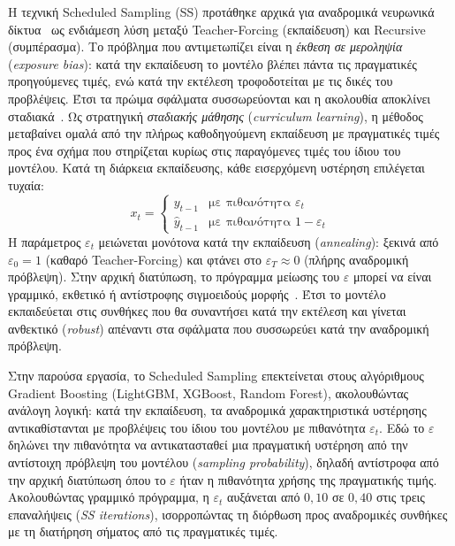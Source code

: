 Η τεχνική Scheduled Sampling (SS) προτάθηκε αρχικά
για αναδρομικά νευρωνικά δίκτυα~\cite{bengio2015scheduled}
ως ενδιάμεση λύση μεταξύ Teacher-Forcing (εκπαίδευση) και Recursive (συμπέρασμα). Το πρόβλημα που αντιμετωπίζει είναι η \emph{έκθεση σε μεροληψία} (\textit{exposure bias}): κατά την εκπαίδευση το μοντέλο βλέπει πάντα τις πραγματικές προηγούμενες τιμές, ενώ κατά την εκτέλεση τροφοδοτείται με τις δικές του προβλέψεις. Έτσι τα πρώιμα σφάλματα συσσωρεύονται και η ακολουθία αποκλίνει σταδιακά~\cite{bengio2015scheduled}. Ως στρατηγική \emph{σταδιακής μάθησης} (\textit{curriculum learning}), η μέθοδος μεταβαίνει ομαλά από την πλήρως καθοδηγούμενη εκπαίδευση με πραγματικές τιμές προς ένα σχήμα που στηρίζεται κυρίως στις παραγόμενες τιμές του ίδιου του μοντέλου. Κατά τη διάρκεια εκπαίδευσης,
κάθε εισερχόμενη υστέρηση επιλέγεται τυχαία:
%
\begin{equation}
  x_t = \begin{cases}
    y_{t-1}       & \text{με πιθανότητα } \varepsilon_t \\
    \hat{y}_{t-1} & \text{με πιθανότητα } 1 - \varepsilon_t
  \end{cases}
  \label{eq:ss}
\end{equation}
%
Η παράμετρος $\varepsilon_t$ μειώνεται μονότονα
κατά την εκπαίδευση (\textit{annealing}): ξεκινά
από $\varepsilon_0 = 1$ (καθαρό Teacher-Forcing)
και φτάνει στο $\varepsilon_T \approx 0$
(πλήρης αναδρομική πρόβλεψη). Στην αρχική διατύπωση, το πρόγραμμα μείωσης του $\varepsilon$ μπορεί να είναι γραμμικό, εκθετικό ή αντίστροφης σιγμοειδούς μορφής~\cite{bengio2015scheduled}. Έτσι το μοντέλο εκπαιδεύεται στις συνθήκες που θα συναντήσει κατά την εκτέλεση και γίνεται ανθεκτικό (\textit{robust}) απέναντι στα σφάλματα που συσσωρεύει κατά την αναδρομική πρόβλεψη.

Στην παρούσα εργασία, το Scheduled Sampling
επεκτείνεται στους αλγόριθμους Gradient Boosting
(LightGBM, XGBoost, Random Forest), ακολουθώντας
ανάλογη λογική: κατά την εκπαίδευση, τα αναδρομικά χαρακτηριστικά υστέρησης αντικαθίστανται με
προβλέψεις του ίδιου του μοντέλου με πιθανότητα $\varepsilon_t$. Εδώ το $\varepsilon$ δηλώνει την πιθανότητα να αντικατασταθεί μια πραγματική υστέρηση από την αντίστοιχη πρόβλεψη του μοντέλου (\textit{sampling probability}), δηλαδή αντίστροφα από την αρχική διατύπωση όπου το $\varepsilon$ ήταν η πιθανότητα χρήσης της πραγματικής τιμής. Ακολουθώντας γραμμικό πρόγραμμα, η $\varepsilon_t$ αυξάνεται από $0{,}10$ σε $0{,}40$ στις τρεις επαναλήψεις
(\textit{SS iterations}), ισορροπώντας τη
διόρθωση προς αναδρομικές συνθήκες με τη
διατήρηση σήματος από τις πραγματικές τιμές.


